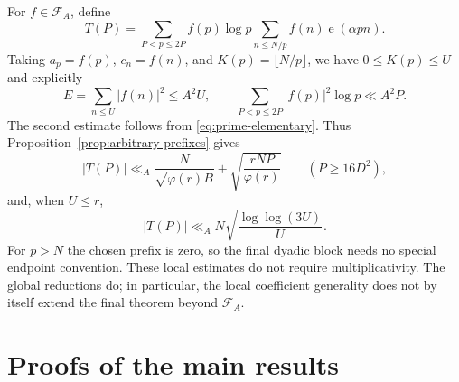 \documentclass[11pt]{amsart}
\numberwithin{equation}{section}
\numberwithin{figure}{section}
\theoremstyle{definition}
\newcommand{\e}{\operatorname{e}}
\newcommand{\FA}{\mathcal F_A}
\begin{document}
For $f\in\FA$, define
\begin{equation}\label{eq:T-def}
 T(P)=\sum_{P<p\le2P}f(p)\log p
                \sum_{n\le N/p}f(n)\e(\alpha pn).
\end{equation}
Taking $a_p=f(p)$, $c_n=f(n)$, and $K(p)=\lfloor N/p\rfloor$,
we have $0\le K(p)\le U$ and explicitly
\[
 E=\sum_{n\le U}|f(n)|^2\le A^2U,
 \qquad
 \sum_{P<p\le2P}|f(p)|^2\log p\ll A^2P.
\]
The second estimate follows from \eqref{eq:prime-elementary}.
Thus Proposition~\ref{prop:arbitrary-prefixes} gives
\begin{equation}\label{eq:block}
 |T(P)|\ll_A\frac{N}{\sqrt{\varphi(r)B}}
                         +\sqrt{\frac{rNP}{\varphi(r)}}
 \qquad(P\ge16D^2),
\end{equation}
and, when $U\le r$,
\begin{equation}\label{eq:large-block}
 |T(P)|\ll_A N\sqrt{\frac{\log\log(3U)}U}.
\end{equation}
For $p>N$ the chosen prefix is zero, so the final dyadic block needs no
special endpoint convention. These local estimates do not require
multiplicativity. The global reductions do; in particular, the local
coefficient generality does not by itself extend the final theorem
beyond $\FA$.

\section{Proofs of the main results}\label{sec:proof}
\end{document}
